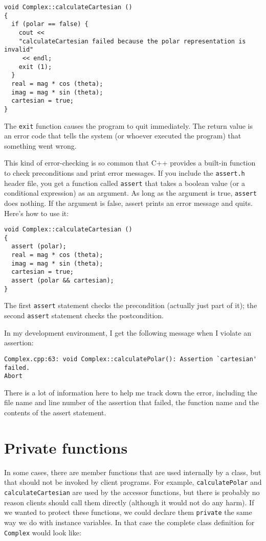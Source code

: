 \begin{verbatim}
void Complex::calculateCartesian ()
{
  if (polar == false) {
    cout <<
    "calculateCartesian failed because the polar representation is invalid"
	 << endl;
    exit (1);
  }
  real = mag * cos (theta);
  imag = mag * sin (theta);
  cartesian = true;
}
\end{verbatim}
%
The {\tt exit} function causes the program to quit immediately.  The
return value is an error code that tells the system (or whoever
executed the program) that something went wrong.


This kind of error-checking is so common that C++ provides
a built-in function to check preconditions and print error messages.
If you include the {\tt assert.h} header file, you get a function
called {\tt assert} that takes a boolean value (or a conditional
expression) as an argument.  As long as the argument is true,
{\tt assert} does nothing.  If the argument is false, assert
prints an error message and quits.  Here's how to use it:

\begin{verbatim}
void Complex::calculateCartesian ()
{
  assert (polar);
  real = mag * cos (theta);
  imag = mag * sin (theta);
  cartesian = true;
  assert (polar && cartesian);
}
\end{verbatim}
%
The first {\tt assert} statement checks the precondition
(actually just part of it); the second {\tt assert} statement
checks the postcondition.

In my development environment, I get the following message
when I violate an assertion:

\begin{verbatim}
Complex.cpp:63: void Complex::calculatePolar(): Assertion `cartesian' failed.
Abort
\end{verbatim}
%
There is a lot of information here to help me track down the error,
including the file name and line number of the assertion that
failed, the function name and the contents of the assert statement.


\section{Private functions}

In some cases, there are member functions that are used internally
by a class, but that should not be invoked by client programs.
For example, {\tt calculatePolar} and {\tt calculateCartesian}
are used by the accessor functions, but there is probably no
reason clients should call them directly (although it would not
do any harm).  If we wanted to protect these functions, we
could declare them {\tt private} the same way we do with instance
variables.  In that case the complete class definition for
{\tt Complex} would look like:

